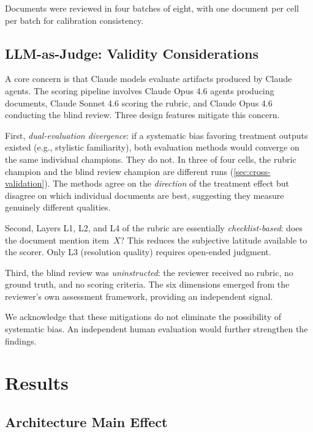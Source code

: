 \documentclass[11pt,letterpaper]{article}
\begin{document}
Documents were reviewed in four batches of eight, with one document per
cell per batch for calibration consistency.

\subsection{LLM-as-Judge: Validity Considerations}
\label{sec:validity}

A core concern is that Claude models evaluate artifacts produced by
Claude agents. The scoring pipeline involves Claude Opus 4.6 agents
producing documents, Claude Sonnet 4.6 scoring the rubric, and Claude
Opus 4.6 conducting the blind review. Three design features mitigate
this concern.

First, \emph{dual-evaluation divergence}: if a systematic bias favoring
treatment outputs existed (e.g., stylistic familiarity), both evaluation
methods would converge on the same individual champions. They do not.
In three of four cells, the rubric champion and the blind review champion
are different runs (\cref{sec:cross-validation}). The methods agree on
the \emph{direction} of the treatment effect but disagree on which
individual documents are best, suggesting they measure genuinely
different qualities.

Second, Layers L1, L2, and L4 of the rubric are essentially
\emph{checklist-based}: does the document mention item~$X$?
This reduces the subjective latitude available to the scorer.
Only L3 (resolution quality) requires open-ended judgment.

Third, the blind review was \emph{uninstructed}: the reviewer received
no rubric, no ground truth, and no scoring criteria. The six dimensions
emerged from the reviewer's own assessment framework, providing an
independent signal.

We acknowledge that these mitigations do not eliminate the possibility
of systematic bias. An independent human evaluation would further
strengthen the findings.


\section{Results}
\label{sec:results}

\subsection{Architecture Main Effect}
\label{sec:main-effect}
\end{document}
